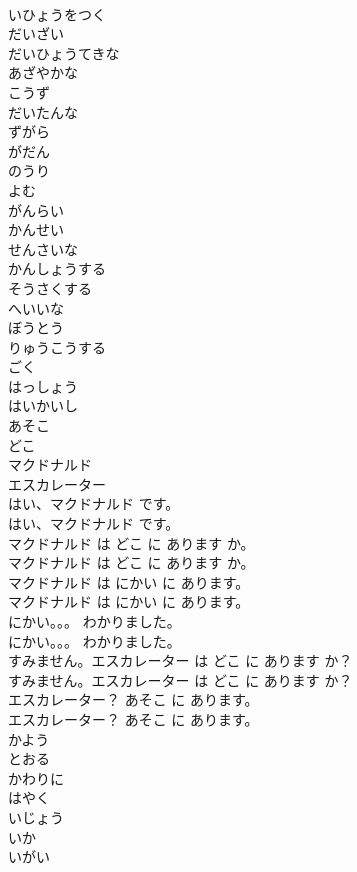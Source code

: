 \documentclass[8pt]{extreport}
\begin{document}
\begin{CJK}{UTF8}{min}
\\	いひょうをつく
\\	だいざい
\\	だいひょうてきな
\\	あざやかな
\\	こうず
\\	だいたんな
\\	ずがら
\\	がだん
\\	のうり
\\	よむ
\\	がんらい
\\	かんせい
\\	せんさいな
\\	かんしょうする
\\	そうさくする
\\	へいいな
\\	ぼうとう
\\	りゅうこうする
\\	ごく
\\	はっしょう
\\	はいかいし
\\	あそこ
\\	どこ
\\	マクドナルド
\\	エスカレーター
\\	はい、マクドナルド です。
\\	はい、マクドナルド です。
\\	マクドナルド は どこ に あります か。
\\	マクドナルド は どこ に あります か。
\\	マクドナルド は にかい に あります。
\\	マクドナルド は にかい に あります。
\\	にかい。。。 わかりました。
\\	にかい。。。 わかりました。
\\	すみません。エスカレーター は どこ に あります か？
\\	すみません。エスカレーター は どこ に あります か？
\\	エスカレーター？ あそこ に あります。
\\	エスカレーター？ あそこ に あります。
\\	かよう
\\	とおる
\\	かわりに
\\	はやく
\\	いじょう
\\	いか
\\	いがい

\end{CJK}
\end{document}
